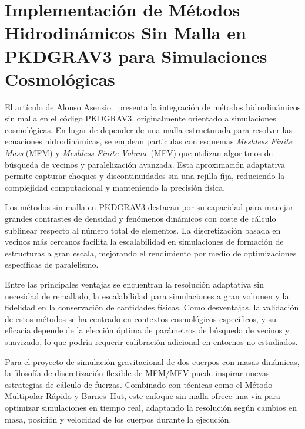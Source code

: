 \section[Métodos Hidrodinámicos Sin Malla]{Implementación de Métodos Hidrodinámicos Sin Malla en PKDGRAV3 para Simulaciones Cosmológicas}%
\label{sec:state_of_the_art_04}

El artículo de Alonso Asensio~\cite{AlonsoAsensio2022} presenta la integración de métodos hidrodinámicos sin malla en el código PKDGRAV3, originalmente orientado a simulaciones cosmológicas. En lugar de depender de una malla estructurada para resolver las ecuaciones hidrodinámicas, se emplean particulas con esquemas \textit{Meshless Finite Mass} (MFM) y \textit{Meshless Finite Volume} (MFV) que utilizan algoritmos de búsqueda de vecinos y paralelización avanzada. Esta aproximación adaptativa permite capturar choques y discontinuidades sin una rejilla fija, reduciendo la complejidad computacional y manteniendo la precisión física.

Los métodos sin malla en PKDGRAV3 destacan por su capacidad para manejar grandes contrastes de densidad y fenómenos dinámicos con coste de cálculo sublinear respecto al número total de elementos. La discretización basada en vecinos más cercanos facilita la escalabilidad en simulaciones de formación de estructuras a gran escala, mejorando el rendimiento por medio de optimizaciones específicas de paralelismo.

Entre las principales ventajas se encuentran la resolución adaptativa sin necesidad de remallado, la escalabilidad para simulaciones a gran volumen y la fidelidad en la conservación de cantidades físicas. Como desventajas, la validación de estos métodos se ha centrado en contextos cosmológicos específicos, y su eficacia depende de la elección óptima de parámetros de búsqueda de vecinos y suavizado, lo que podría requerir calibración adicional en entornos no estudiados.

Para el proyecto de simulación gravitacional de dos cuerpos con masas dinámicas, la filosofía de discretización flexible de MFM/MFV puede inspirar nuevas estrategias de cálculo de fuerzas. Combinado con técnicas como el Método Multipolar Rápido y Barnes–Hut, este enfoque sin malla ofrece una vía para optimizar simulaciones en tiempo real, adaptando la resolución según cambios en masa, posición y velocidad de los cuerpos durante la ejecución.

